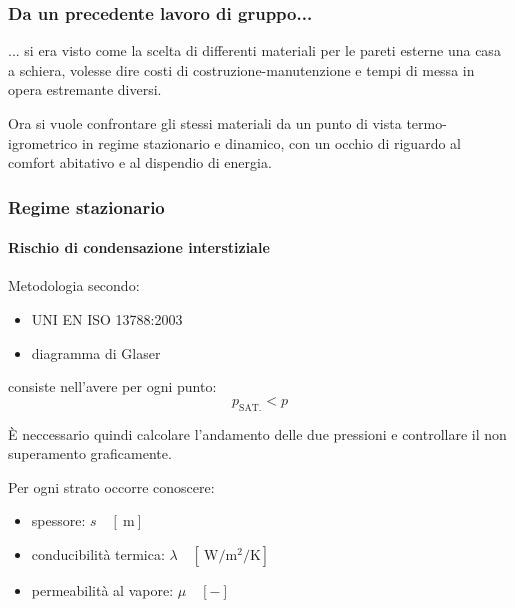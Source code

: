 \documentclass[aspectratio=141,10pt]{beamer}
\newcommand{\e}{\`E\xspace}  %
\begin{document}
\begin{frame}
    \frametitle{Da un precedente lavoro di gruppo...}
    ... si era visto come la scelta di differenti materiali per le pareti esterne una casa a schiera, volesse dire costi di costruzione-manutenzione e tempi di messa in opera estremante diversi.
    \vspace{2cm}

    Ora si vuole confrontare gli stessi materiali da un punto di vista termo-igrometrico in regime stazionario e dinamico, con un occhio di riguardo al comfort abitativo e al dispendio di energia.
\end{frame}
\begin{frame}
    \frametitle{Regime stazionario}
    \framesubtitle{Rischio di condensazione interstiziale} 
    Metodologia secondo:
    \begin{itemize}
        \item UNI EN ISO 13788:2003
        \item diagramma di Glaser
    \end{itemize}
    consiste nell'avere per ogni punto:
        \begin{equation*}
            p_{\text{SAT.}} < p 
        \end{equation*}
\pause
\vspace{1cm}

\e neccessario quindi calcolare l'andamento delle due pressioni e controllare il non superamento graficamente. 

Per ogni strato occorre conoscere:
\begin{itemize}
    \item spessore: $s \quad [\SI{}{\metre}]$
    \item conducibilità termica: $\lambda \quad [\SI{}{\watt\per\metre\squared\per\kelvin}]$
    \item permeabilità al vapore: $\mu \quad [-]$
\end{itemize}    
\end{frame}
\end{document}
